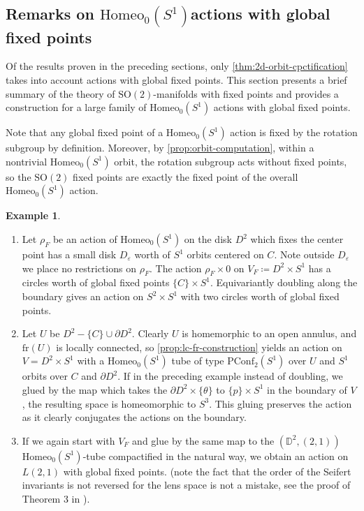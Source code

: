 \documentclass[10pt, oneside]{article}
\newcommand{\D}{\mathbb{D}}
\newcommand{\SO}[1][2]{\text{SO}(#1)}
\newcommand{\homeo}[1][S^1]{\text{Homeo}_0(#1)}
\newcommand{\pconf}[2][S^1]{\text{PConf}_{#2}(#1)}
\newcommand{\fr}[1]{\text{fr}(#1)}
\newcommand{\titlesafehomeo}{\texorpdfstring{$\homeo$}{Homeo\_0(S\^string 1)}}
\theoremstyle{definition}
\newtheorem{eg}{Example}[section]
\theoremstyle{definition}
\begin{document}
\subsection{Remarks on \titlesafehomeo actions with global fixed points}\label{subsec:fixed-points} 
Of the results proven in the preceding sections, only \cref{thm:2d-orbit-cpctification} takes into account actions with global fixed points. This section presents a brief summary of the theory of $\SO$-manifolds with fixed points and provides a construction for a large family of $\homeo$ actions with global fixed points. 

Note that any global fixed point of a $\homeo$ action is fixed by the rotation subgroup by definition. Moreover, by \cref{prop:orbit-computation}, within a nontrivial $\homeo$ orbit, the rotation subgroup acts without fixed points, so the $\SO$ fixed points are exactly the fixed point of the overall $\homeo$ action. 

\begin{eg}\leavevmode
    \begin{enumerate}
        \item Let $\rho_F$ be an action of $\homeo$ on the disk $D^2$ which fixes the center point has a small disk $D_\varepsilon$ worth of $S^1$ orbits centered on $C$. Note outside $D_\varepsilon$ we place no restrictions on $\rho_F$. The action $\rho_F \times 0$ on $V_F \coloneqq D^2\times S^1$ has a circles worth of global fixed points $\{C\}\times S^1$. Equivariantly doubling along the boundary gives an action on $S^2\times S^1$ with two circles worth of global fixed points.

        \item Let $U$ be $D^2 - \{C\}\cup\partial D^2$. Clearly $U$ is homemorphic to an open annulus, and $\fr{U}$ is locally connected, so \cref{prop:lc-fr-construction} yields an action on $V= D^2\times S^1$ with a $\homeo$ tube of type $\pconf{2}$ over $U$ and $S^1$ orbits over $C$ and $\partial D^2$. If in the preceding example instead of doubling, we glued by the map which takes the $\partial D^2 \times \{\theta\}$ to $\{p\}\times S^1$ in the boundary of $V$, the resulting space is homeomorphic to $S^3$. This gluing preserves the action as it clearly conjugates the actions on the boundary.
        
        \item If we again start with $V_F$ and glue by the same map to the $(\D^2, (2,1))$ $\homeo$-tube compactified in the natural way, we obtain an action on $L(2, 1)$ with global fixed points. (note the fact that the order of the Seifert invariants is not reversed for the lens space is not a mistake, see the proof of Theorem 3 in \cite{orlik:ActionsSO2}).
    \end{enumerate}
\end{eg}
\end{document}
